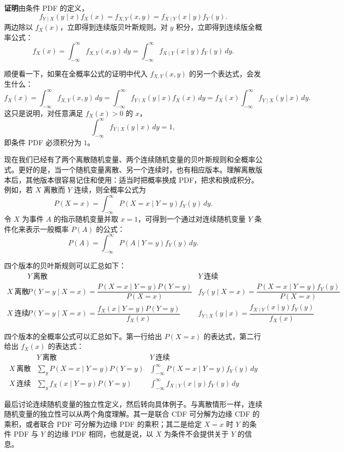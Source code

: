 \documentclass[UTF8, 12pt, fontset=fandol, oneside]{ctexart}
\begin{document}
\noindent\textbf{证明}\quad 由条件 PDF 的定义，
\[
  f_{Y\mid X}(y\mid x)f_X(x)=f_{X,Y}(x,y)=f_{X\mid Y}(x\mid y)f_Y(y).
\]
两边除以 $f_X(x)$，立即得到连续版贝叶斯规则。对 $y$ 积分，立即得到连续版全概率公式：
\[
  f_X(x)=\int_{-\infty}^{\infty} f_{X,Y}(x,y)\,dy
  =\int_{-\infty}^{\infty} f_{X\mid Y}(x\mid y)f_Y(y)\,dy.
\]

顺便看一下，如果在全概率公式的证明中代入 $f_{X,Y}(x,y)$ 的另一个表达式，会发生什么：
\[
  f_X(x)=\int_{-\infty}^{\infty} f_{X,Y}(x,y)\,dy
  =\int_{-\infty}^{\infty} f_{Y\mid X}(y\mid x)f_X(x)\,dy
  =f_X(x)\int_{-\infty}^{\infty} f_{Y\mid X}(y\mid x)\,dy.
\]
这只是说明，对任意满足 $f_X(x)>0$ 的 $x$，
\[
  \int_{-\infty}^{\infty} f_{Y\mid X}(y\mid x)\,dy=1,
\]
即条件 PDF 必须积分为 $1$。

现在我们已经有了两个离散随机变量、两个连续随机变量的贝叶斯规则和全概率公式。更好的是，当一个随机变量离散、另一个连续时，也有相应版本。理解离散版本后，其他版本很容易记住和使用：适当时把概率换成 PDF，把求和换成积分。例如，若 $X$ 离散而 $Y$ 连续，则全概率公式为
\[
  P(X=x)=\int_{-\infty}^{\infty}P(X=x\mid Y=y)f_Y(y)\,dy.
\]
令 $X$ 为事件 $A$ 的指示随机变量并取 $x=1$，可得到一个通过对连续随机变量 $Y$ 条件化来表示一般概率 $P(A)$ 的公式：
\[
  P(A)=\int_{-\infty}^{\infty}P(A\mid Y=y)f_Y(y)\,dy.
\]

四个版本的贝叶斯规则可以汇总如下：
\[
\begin{array}{c|cc}
 & Y\ \text{离散} & Y\ \text{连续}\\ \hline
X\ \text{离散} &
P(Y=y\mid X=x)=\dfrac{P(X=x\mid Y=y)P(Y=y)}{P(X=x)} &
f_Y(y\mid X=x)=\dfrac{P(X=x\mid Y=y)f_Y(y)}{P(X=x)}
\\[1.1em]
X\ \text{连续} &
P(Y=y\mid X=x)=\dfrac{f_X(x\mid Y=y)P(Y=y)}{f_X(x)} &
f_{Y\mid X}(y\mid x)=\dfrac{f_{X\mid Y}(x\mid y)f_Y(y)}{f_X(x)}
\end{array}
\]

四个版本的全概率公式可以汇总如下。第一行给出 $P(X=x)$ 的表达式，第二行给出 $f_X(x)$ 的表达式：
\[
\begin{array}{c|cc}
 & Y\ \text{离散} & Y\ \text{连续}\\ \hline
X\ \text{离散} &
\sum_y P(X=x\mid Y=y)P(Y=y) &
\int_{-\infty}^{\infty}P(X=x\mid Y=y)f_Y(y)\,dy
\\[1.1em]
X\ \text{连续} &
\sum_y f_X(x\mid Y=y)P(Y=y) &
\int_{-\infty}^{\infty}f_{X\mid Y}(x\mid y)f_Y(y)\,dy
\end{array}
\]

最后讨论连续随机变量的独立性定义，然后转向具体例子。与离散情形一样，连续随机变量的独立性可以从两个角度理解。其一是联合 CDF 可分解为边缘 CDF 的乘积，或者联合 PDF 可分解为边缘 PDF 的乘积；其二是给定 $X=x$ 时 $Y$ 的条件 PDF 与 $Y$ 的边缘 PDF 相同，也就是说，以 $X$ 为条件不会提供关于 $Y$ 的信息。
\end{document}
